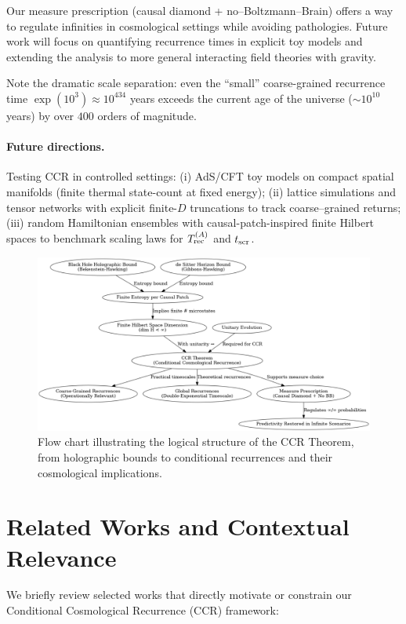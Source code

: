 \documentclass[12pt]{article}
\theoremstyle{remark}
\begin{document}
\vspace{0.3cm}

Our measure prescription (causal diamond + no--Boltzmann--Brain) offers a way to regulate infinities 
in cosmological settings while avoiding pathologies. 
Future work will focus on quantifying recurrence times in explicit toy models and extending the analysis 
to more general interacting field theories with gravity.

Note the dramatic scale separation: even the ``small'' coarse-grained recurrence time 
$\exp(10^{3}) \approx 10^{434}$ years exceeds the current age of the universe 
($\sim 10^{10}$ years) by over $400$ orders of magnitude.

\paragraph{Future directions.}
Testing CCR in controlled settings: (i) AdS/CFT toy models on compact spatial manifolds (finite thermal state-count at fixed energy); (ii) lattice simulations and tensor networks with explicit finite-$D$ truncations to track coarse--grained returns; (iii) random Hamiltonian ensembles with causal-patch-inspired finite Hilbert spaces to benchmark scaling laws for $T_{\rm rec}^{(A)}$ and $t_{\rm scr}$.


\begin{figure}[H]
    \centering
\includegraphics[width=0.9\linewidth]{CCR_flowchart}
    \caption{Flow chart illustrating the logical structure of the CCR Theorem, from holographic bounds to conditional recurrences and their cosmological implications.}
    \label{fig:CCR_flowchart}
\end{figure}


\section*{Related Works and Contextual Relevance}
We briefly review selected works that directly motivate or constrain our Conditional Cosmological Recurrence (CCR) framework:
\end{document}
